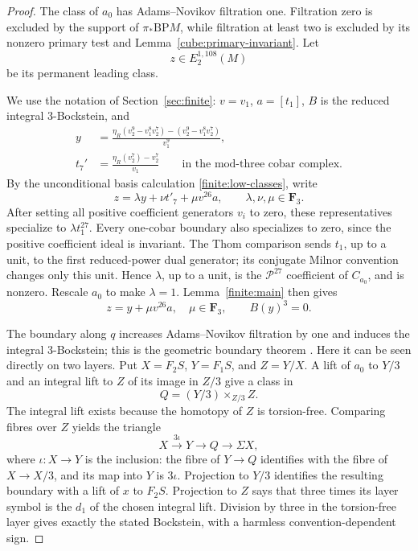 \documentclass[11pt]{article}
\theoremstyle{definition}
\theoremstyle{remark}
\numberwithin{equation}{section}
\begin{document}
\begin{proof}
The class of \(a_0\) has Adams--Novikov filtration one.  Filtration
zero is excluded by the support of \(\pi_*\mathrm{BP} M\), while filtration
at least two is excluded by its nonzero primary test and
Lemma~\ref{cube:primary-invariant}.  Let
\[
 z\in E_2^{1,108}(M)
\]
be its permanent leading class.

We use the notation of Section~\ref{sec:finite}: \(v=v_1\),
\(a=[t_1]\), \(B\) is the reduced integral 3-Bockstein, and
\begin{align*}
 y&=\frac{\eta_R(v_2^9-v_1^8v_2^7)-(v_2^9-v_1^8v_2^7)}{v_1^9},\\
 t_7'&=\frac{\eta_R(v_2^7)-v_2^7}{v_1}
 \qquad\text{in the mod-three cobar complex}.
\end{align*}
By the unconditional basis calculation \eqref{finite:low-classes}, write
\[
 z=\lambda y+\nu t'_7+\mu v^{26}a,
 \qquad \lambda,\nu,\mu\in\mathbf F_3.
\]
After setting all positive coefficient generators \(v_i\) to zero,
these representatives specialize to \(\lambda t_1^{27}\).
Every one-cobar boundary also specializes to zero, since the
positive coefficient ideal is invariant.  The Thom comparison
sends \(t_1\), up to a unit, to the first reduced-power dual
generator; its conjugate Milnor convention changes only this
unit.  Hence \(\lambda\), up to a unit, is the
\(\mathcal P^{27}\) coefficient of \(C_{a_0}\), and is nonzero.
Rescale \(a_0\) to make \(\lambda=1\).
Lemma~\ref{finite:main} then gives
\begin{equation}\label{cube:leading-class}
 z=y+\mu v^{26}a,\quad\mu\in\mathbf F_3,\qquad B(y)^3=0.
\end{equation}

The boundary along \(q\) increases Adams--Novikov filtration by one
and induces the integral 3-Bockstein; this is the geometric boundary
theorem \cite[Theorem~2.3.4]{Ravenel}.  Here it can be seen directly
on two layers.  Put \(X=F_2S\), \(Y=F_1S\), and \(Z=Y/X\).
A lift of \(a_0\) to \(Y/3\) and an integral lift to \(Z\) of its
image in \(Z/3\) give a class in
\[
 Q=(Y/3)\mathbin{\times}_{Z/3}Z.
\]
The integral lift exists because the homotopy of \(Z\) is
torsion-free.  Comparing fibres over \(Z\) yields the triangle
\[
 X\xrightarrow{\,3\iota\,}Y
 \longrightarrow Q\longrightarrow\Sigma X,
\]
where \(\iota:X\to Y\) is the inclusion: the fibre of
\(Y\to Q\) identifies with the fibre of \(X\to X/3\),
and its map into \(Y\) is \(3\iota\).
Projection to \(Y/3\) identifies the resulting boundary with a lift
of \(x\) to \(F_2S\).  Projection to \(Z\) says that three times its
layer symbol is the \(d_1\) of the chosen integral lift.  Division
by three in the torsion-free layer gives exactly the stated
Bockstein, with a harmless convention-dependent sign.


\end{proof}
\end{document}
